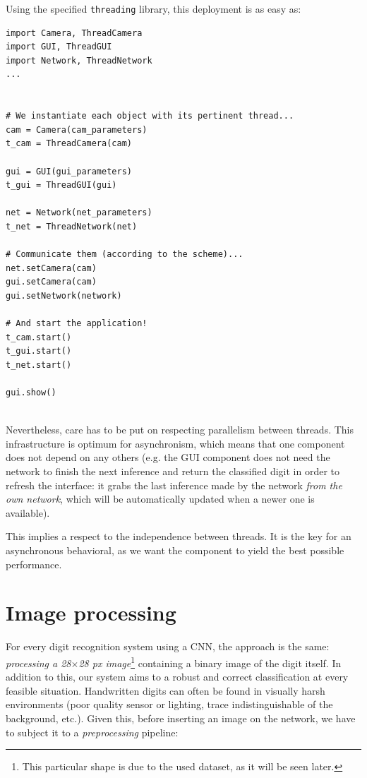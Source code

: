 		Using the specified \texttt{threading} library, this deployment is as easy as:
		
		\begin{lstlisting}
import Camera, ThreadCamera
import GUI, ThreadGUI
import Network, ThreadNetwork
...


# We instantiate each object with its pertinent thread...
cam = Camera(cam_parameters)
t_cam = ThreadCamera(cam)

gui = GUI(gui_parameters)
t_gui = ThreadGUI(gui)

net = Network(net_parameters)
t_net = ThreadNetwork(net)

# Communicate them (according to the scheme)...
net.setCamera(cam)
gui.setCamera(cam)
gui.setNetwork(network)

# And start the application!
t_cam.start()
t_gui.start()
t_net.start()

gui.show()


		\end{lstlisting}
		Nevertheless, care has to be put on respecting parallelism between threads. This infrastructure is optimum for asynchronism, which means that one component does not depend on any others (e.g. the GUI component does not need the network to finish the next inference and return the classified digit in order to refresh the interface: it grabs the last inference made by the network \emph{from the own network}, which will be automatically updated when a newer one is available).
		
		This implies a respect to the independence between threads. It is the key for an asynchronous behavioral, as we want the component to yield the best possible performance.\\
		
	\section{Image processing}
		For every digit recognition system using a CNN, the approach is the same: \emph{processing a 28$\times$28 px image}\footnote{This particular shape is due to the used dataset, as it will be seen later.} containing a binary image of the digit itself. In addition to this, our system aims to a robust and correct classification at every feasible situation. Handwritten digits can often be found in visually harsh environments (poor quality sensor or lighting, trace indistinguishable of the background, etc.). Given this, before inserting an image on the network, we have to subject it to a \emph{preprocessing} pipeline:
		
